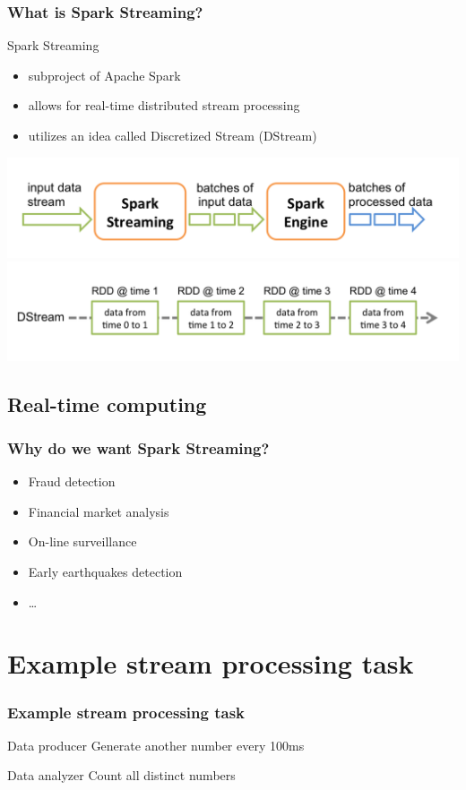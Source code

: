 \documentclass{beamer}
\begin{document}
\begin{frame}
\frametitle{What is Spark Streaming?}

\begin{block}{Spark Streaming}
\begin{itemize}
	\item subproject of Apache Spark\texttrademark
	\item allows for real-time distributed stream processing
	\item utilizes an idea called Discretized Stream (DStream)
\end{itemize}
\vspace{-1em}
\includegraphics[width=\textwidth]{img/streaming-flow.png}
\vspace{-1em}
\includegraphics[width=\textwidth]{img/streaming-dstream.png}

\end{block}
\end{frame}

\subsection*{Real-time computing}
\begin{frame}
\frametitle{Why do we want Spark Streaming?}
	\begin{itemize}
		\item Fraud detection
		\item Financial market analysis
		\item On-line surveillance
		\item Early earthquakes detection
		\item \ldots
	\end{itemize}
\end{frame}

\section{Example stream processing task}
\begin{frame}
\frametitle{Example stream processing task}
\begin{block}{Data producer}
	Generate another number every 100ms
\end{block}
\begin{block}{Data analyzer}
	Count all distinct numbers
\end{block}
\end{frame}
\end{document}

